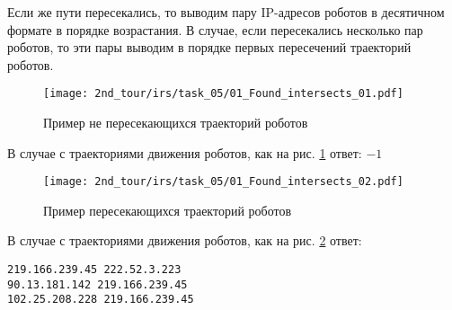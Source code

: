 Если же пути пересекались, то выводим пару IP-адресов роботов в десятичном формате в порядке возрастания. В случае, если пересекались несколько пар роботов, то эти пары выводим в порядке первых пересечений траекторий роботов.\\

\begin{figure}[h!]
	\centering
	\texttt{[image: 2nd\_tour/irs/task\_05/01\_Found\_intersects\_01.pdf]}
	\caption{Пример не пересекающихся траекторий роботов}
	\label{fig:01_Found_intersects_01}
\end{figure}

В случае с траекториями движения роботов, как на рис. \ref{fig:01_Found_intersects_01} ответ: $-1$


\begin{figure}[h!]
	\centering
	\texttt{[image: 2nd\_tour/irs/task\_05/01\_Found\_intersects\_02.pdf]}
	\caption{Пример пересекающихся траекторий роботов}
	\label{fig:01_Found_intersects_02}
\end{figure}

В случае с траекториями движения роботов, как на рис. \ref{fig:01_Found_intersects_02} ответ: \\

\begin{verbatim}
219.166.239.45 222.52.3.223
90.13.181.142 219.166.239.45
102.25.208.228 219.166.239.45
\end{verbatim}


\codeExample

